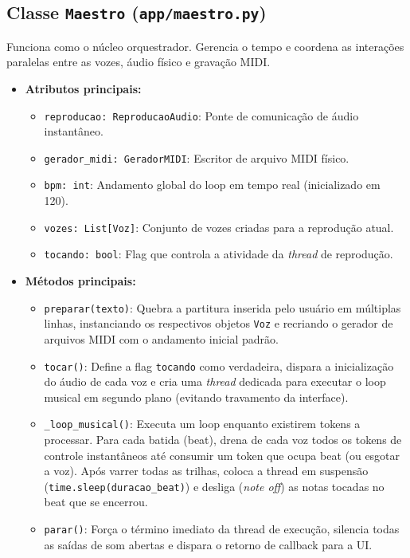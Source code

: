 \documentclass[12pt, a4paper]{article}
\begin{document}
\subsection{Classe \texttt{Maestro} (\texttt{app/maestro.py})}
Funciona como o núcleo orquestrador. Gerencia o tempo e coordena as interações paralelas entre as vozes, áudio físico e gravação MIDI.
\begin{itemize}
  \item \textbf{Atributos principais:}
    \begin{itemize}
      \item \texttt{reproducao: ReproducaoAudio}: Ponte de comunicação de áudio instantâneo.
      \item \texttt{gerador\_midi: GeradorMIDI}: Escritor de arquivo MIDI físico.
      \item \texttt{bpm: int}: Andamento global do loop em tempo real (inicializado em 120).
      \item \texttt{vozes: List[Voz]}: Conjunto de vozes criadas para a reprodução atual.
      \item \texttt{tocando: bool}: Flag que controla a atividade da \textit{thread} de reprodução.
    \end{itemize}
  \item \textbf{Métodos principais:}
    \begin{itemize}
      \item \texttt{preparar(texto)}: Quebra a partitura inserida pelo usuário em múltiplas linhas, instanciando os respectivos objetos \texttt{Voz} e recriando o gerador de arquivos MIDI com o andamento inicial padrão.
      \item \texttt{tocar()}: Define a flag \texttt{tocando} como verdadeira, dispara a inicialização do áudio de cada voz e cria uma \textit{thread} dedicada para executar o loop musical em segundo plano (evitando travamento da interface).
      \item \texttt{\_loop\_musical()}: Executa um loop enquanto existirem tokens a processar. Para cada batida (beat), drena de cada voz todos os tokens de controle instantâneos até consumir um token que ocupa beat (ou esgotar a voz). Após varrer todas as trilhas, coloca a thread em suspensão (\texttt{time.sleep(duracao\_beat)}) e desliga (\textit{note off}) as notas tocadas no beat que se encerrou.
      \item \texttt{parar()}: Força o término imediato da thread de execução, silencia todas as saídas de som abertas e dispara o retorno de callback para a UI.
    \end{itemize}
\end{itemize}
\end{document}
